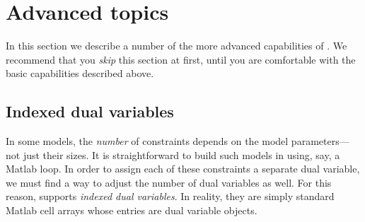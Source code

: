 \documentclass[12pt]{article}
\begin{document}
\section{Advanced topics}

In this section we describe a number of the more advanced capabilities of \cvx.
We recommend that you \emph{skip} this section at first, until you are comfortable
with the basic capabilities described above.

\subsection{Indexed dual variables}
\label{sec:indexeddual}

In some models, the \emph{number} of constraints depends on the model
parameters---not just their sizes. It is
straightforward to build such models in \cvx using, say, a
Matlab \verb@for@ loop. In order to assign each of these constraints
a separate dual variable, we must find a way to adjust the number of
dual variables as well. For this reason, \cvx supports
\emph{indexed dual variables}. In reality, they are simply standard
Matlab cell arrays whose entries are \cvx dual variable objects.
\end{document}
